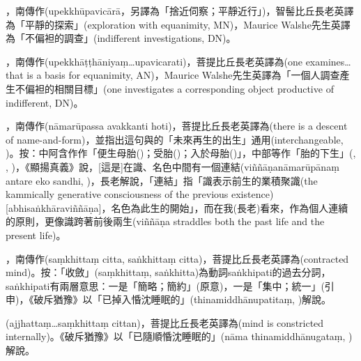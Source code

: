 \startitemgroup[noteitems]
\item{}，南傳作(upekkhūpavicārā，另譯為「捨近伺察；平靜近行」)，智髻比丘長老英譯為「平靜的探索」(exploration with equanimity, MN)，Maurice Walshe先生英譯為「不偏袒的調查」(indifferent investigations, DN)。
\item{}，南傳作(upekkhāṭṭhāniyaṃ…upavicarati)，菩提比丘長老英譯為(one examines…that is a basis for equanimity, AN)，Maurice Walshe先生英譯為「一個人調查產生不偏袒的相關目標」(one investigates a corresponding object productive of indifferent, DN)。
\stopitemgroup

\startitemgroup[noteitems]
\item{}，南傳作(nāmarūpassa avakkanti hoti)，菩提比丘長老英譯為(there is a descent of name-and-form)，並指出這句與的「未來再生的出生」通用(interchangeable, )。按：中阿含作作「便生母胎()；受胎()；入於母胎()」，中部等作「胎的下生」(, , )，《顯揚真義》說，[這是]在識、名色中間有一個連結(viññāṇanāmarūpānaṃ antare eko sandhi, )，長老解說，「連結」指「識表示前生的業積聚識(the kammically generative consciousness of the previous existence)[abhisaṅkhāraviññāṇa]，名色為此生的開始」，而在我(長老)看來，作為個人連續的原則，更像識跨著前後兩生(viññāṇa straddles both the past life and the present life)。
\stopitemgroup

\startitemgroup[noteitems]
\item{}，南傳作(saṃkhittaṃ citta, saṅkhittaṃ citta)，菩提比丘長老英譯為(contracted mind)。按：「收斂」(saṃkhittaṃ, saṅkhitta)為動詞saṅkhipati的過去分詞，saṅkhipati有兩層意思：一是「簡略；簡約」(原意)，一是「集中；統一」(引申)，《破斥猶豫》以「已掉入惛沈睡眠的」(thinamiddhānupatitaṃ, )解說。
\item{}(ajjhattaṃ…saṃkhittaṃ cittan)，菩提比丘長老英譯為(mind is constricted internally)。《破斥猶豫》以「已隨順惛沈睡眠的」(nāma thinamiddhānugataṃ, )解說。
\stopitemgroup

